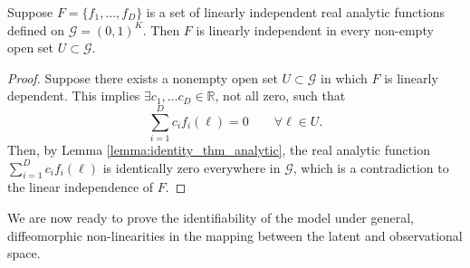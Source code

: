 \begin{lemma} \label{lemma:li_open_sets}
    Suppose $F = \{ f_1, \ldots, f_D\}$ is a set of linearly independent real analytic functions defined on $\mathcal{G} = (0, 1)^K$. Then $F$ is linearly independent in every non-empty open set $U \subset \mathcal{G}$.
\end{lemma}
\begin{proof}
Suppose there exists a nonempty open set $U \subset \mathcal{G}$ in which $F$ is linearly dependent. This implies $\exists c_1, \ldots c_D \in \mathbb{R}$, not all zero, such that
\begin{equation*}
    \sum_{i=1}^D c_i f_i(\ell) = 0 \qquad \forall \ell \in U.
\end{equation*}
Then, by Lemma \ref{lemma:identity_thm_analytic}, the real analytic function $\sum_{i=1}^D c_i f_i(\ell)$ is identically zero everywhere in $\mathcal{G}$, which is a contradiction to the linear independence of $F$. 
\end{proof} 

We are now ready to prove the identifiability of the model under general, diffeomorphic non-linearities in the mapping between the latent and observational space.

